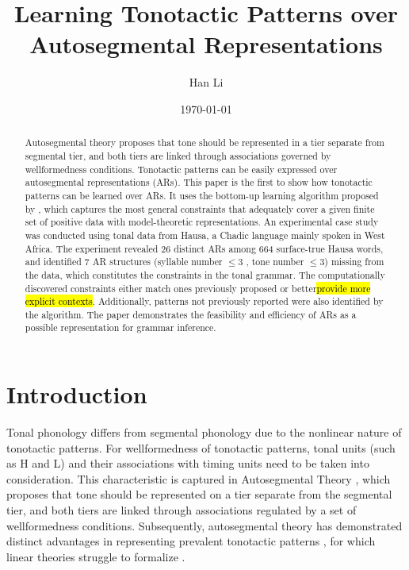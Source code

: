 \documentclass[11pt,letterpaper]{article}
\title{Learning Tonotactic Patterns over Autosegmental Representations}
\author{Han Li}
\date{\today}
\begin{document}
 
	\maketitle
	
\begin{abstract}
	Autosegmental theory \citep{goldsmith1976autosegmental} proposes that tone should be represented in a tier separate from segmental tier, and both tiers are linked through associations governed  by wellformedness conditions. Tonotactic patterns can be easily expressed over autosegmental representations (ARs). This paper is the first to show how tonotactic patterns can be learned over ARs. It uses the bottom-up learning algorithm proposed by \cite{chandleeLearningPartiallyOrdered2019}, which captures the most general constraints that adequately cover a given finite set of positive data  with model-theoretic representations. An experimental case study was conducted using tonal data from Hausa, a Chadic language mainly spoken in West Africa. The experiment revealed 26 distinct ARs among 664 surface-true Hausa words, and identified 7 AR structures (syllable number \(\leq 3 \) , tone number \(\leq 3\)) missing from the data, which constitutes the constraints in the tonal grammar. The computationally discovered constraints either match ones previously proposed or better\hl{provide more explicit contexts}. Additionally, patterns not previously reported were also identified by the algorithm. The paper demonstrates the feasibility and efficiency of ARs as a possible representation for grammar inference.
\end{abstract}

\setlength\parskip{3pt}
\section{Introduction}

Tonal phonology differs from segmental phonology due to the nonlinear nature of tonotactic patterns. For wellformedness of tonotactic patterns, tonal units (such as H and L) and their associations with timing units need to be taken into consideration. This characteristic is captured in Autosegmental Theory \citep{goldsmith1976autosegmental}, which proposes that tone should be represented on a tier separate from the segmental tier, and both tiers are linked through associations regulated by a set of wellformedness conditions. Subsequently, autosegmental theory has demonstrated distinct advantages in representing prevalent tonotactic patterns \citep{hyman2011tone}, for which linear theories struggle to formalize \citep{odden1994adjacency}.
\end{document}
